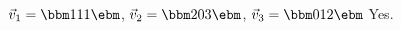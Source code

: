 {$\vec{v}_1 = \bbm 1\\1\\1\ebm$, $\vec{v}_2 = \bbm 2\\0\\3\ebm$, $\vec{v}_3 = \bbm 0\\1\\2\ebm$}
{Yes.}